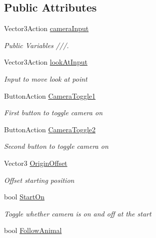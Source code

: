 \subsection*{Public Attributes}
\begin{DoxyCompactItemize}
\item 
Vector3\+Action \mbox{\hyperlink{class_manual_camera_movement_a9d77f87895d77561f1e2364732e27f73}{camera\+Input}}
\begin{DoxyCompactList}\small\item\em Public Variables ///. \end{DoxyCompactList}\item 
Vector3\+Action \mbox{\hyperlink{class_manual_camera_movement_a0ac7f0cc6e4047e94f177ef964ff3a2e}{look\+At\+Input}}
\begin{DoxyCompactList}\small\item\em Input to move look at point \end{DoxyCompactList}\item 
Button\+Action \mbox{\hyperlink{class_manual_camera_movement_a8d1d608815cd9a9a8bd8639ac24ef304}{Camera\+Toggle1}}
\begin{DoxyCompactList}\small\item\em First button to toggle camera on \end{DoxyCompactList}\item 
Button\+Action \mbox{\hyperlink{class_manual_camera_movement_ad374a1ea7b330ee00e19f74a0554f515}{Camera\+Toggle2}}
\begin{DoxyCompactList}\small\item\em Second button to toggle camera on \end{DoxyCompactList}\item 
Vector3 \mbox{\hyperlink{class_manual_camera_movement_ab7f212784a7b315eda18f01aec187a78}{Origin\+Offset}}
\begin{DoxyCompactList}\small\item\em Offset starting position \end{DoxyCompactList}\item 
bool \mbox{\hyperlink{class_manual_camera_movement_aabdb8ce630c89c62182c5d657a205911}{Start\+On}}
\begin{DoxyCompactList}\small\item\em Toggle whether camera is on and off at the start \end{DoxyCompactList}\item 
bool \mbox{\hyperlink{class_manual_camera_movement_a0f8bbd6e136e0f1ad5bd95a4f13fb8c6}{Follow\+Animal}}

\end{DoxyCompactItemize}
